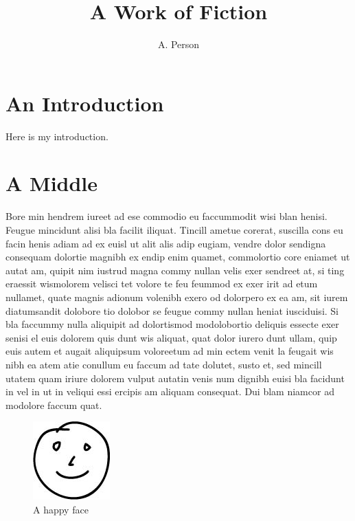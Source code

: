 \documentclass[twocolumn]{article}
\author{A. Person}
\title{A Work of Fiction}
\begin{document}
\maketitle

\tableofcontents

\section{An Introduction}
Here is my introduction.

\section{A Middle}
Bore min hendrem iureet ad ese commodio eu faccummodit wisi blan henisi.
Feugue mincidunt alisi bla facilit iliquat.
Tincill ametue corerat, suscilla cons eu facin henis adiam ad ex euisl ut alit alis adip eugiam, vendre dolor sendigna consequam dolortie magnibh ex endip enim quamet, commolortio core eniamet ut autat am, quipit nim iustrud magna commy nullan velis exer sendreet at, si ting eraessit wismolorem velisci tet volore te feu feummod ex exer irit ad etum nullamet, quate magnis adionum volenibh exero od dolorpero ex ea am, sit iurem diatumsandit dolobore tio dolobor se feugue commy nullan heniat iusciduisi.
Si bla faccummy nulla aliquipit ad dolortismod modolobortio deliquis essecte exer senisi el euis dolorem quis dunt wis aliquat, quat dolor iurero dunt ullam, quip euis autem et augait aliquipsum voloreetum ad min ectem venit la feugait wis nibh ea atem atie conullum eu faccum ad tate dolutet, susto et, sed mincill utatem quam iriure dolorem vulput autatin venis num dignibh euisi bla facidunt in vel in ut in veliqui essi ercipis am aliquam consequat. Dui blam niamcor ad modolore faccum quat.

\begin{figure}[t]
\caption{A happy face}
\centering
\includegraphics{ex10.jpg}
\end{figure}
\end{document}

